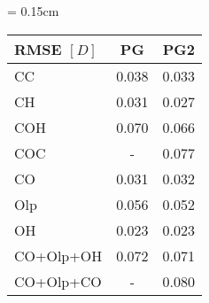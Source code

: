\documentclass[multi=tabular]{standalone}
\begin{document}
 \renewcommand{\arraystretch}{1.5}
{\tabcolsep = 0.15cm
  \begin{tabular}{lcc}
   \hline\hline
     RMSE $[D]$ & PG & PG2 \\ \hline
     CC         &  0.038  & 0.033 \\ 
     CH         &  0.031  & 0.027 \\ 
     COH        &  0.070  & 0.066 \\ 
     COC        &  -      & 0.077 \\ \hline
     CO         &  0.031  & 0.032 \\ 
     Olp        &  0.056  & 0.052 \\ 
     OH         &  0.023  & 0.023 \\
     CO+Olp+OH  &  0.072  & 0.071 \\ 
     CO+Olp+CO  &  -      & 0.080 \\ 
     \hline\hline 

  \end{tabular}
}
\renewcommand{\arraystretch}{1.0}

%

\end{document}
